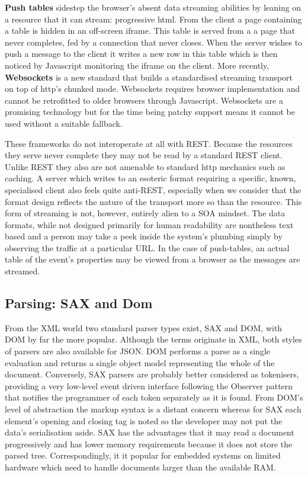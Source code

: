 \documentclass[]{article}
\begin{document}
\textbf{Push tables} sidestep the browser's absent data streaming
abilities by leaning on a resource that it can stream: progressive html.
From the client a page containing a table is hidden in an off-screen
iframe. This table is served from a a page that never completes, fed by
a connection that never closes. When the server wishes to push a message
to the client it writes a new row in this table which is then noticed by
Javascript monitoring the iframe on the client. More recently,
\textbf{Websockets} is a new standard that builds a standardised
streaming transport on top of http's chunked mode. Websockets requires
browser implementation and cannot be retrofitted to older browsers
through Javascript. Websockets are a promising technology but for the
time being patchy support means it cannot be used without a suitable
fallback.

These frameworks do not interoperate at all with REST. Because the
resources they serve never complete they may not be read by a standard
REST client. Unlike REST they also are not amenable to standard http
mechanics such as caching. A server which writes to an esoteric format
requiring a specific, known, specialised client also feels quite
anti-REST, especially when we consider that the format design reflects
the nature of the transport more so than the resource. This form of
streaming is not, however, entirely alien to a SOA mindset. The data
formats, while not designed primarily for human readability are
nontheless text based and a person may take a peek inside the system's
plumbing simply by observing the traffic at a particular URL. In the
case of push-tables, an actual table of the event's properties may be
viewed from a browser as the messages are streamed.

\subsection{Parsing: SAX and Dom}

From the XML world two standard parser types exist, SAX and DOM, with
DOM by far the more popular. Although the terms originate in XML, both
styles of parsers are also available for JSON. DOM performs a parse as a
single evaluation and returns a single object model representing the
whole of the document. Conversely, SAX parsers are probably better
considered as tokenisers, providing a very low-level event driven
interface following the Observer pattern that notifies the programmer of
each token separately as it is found. From DOM's level of abstraction
the markup syntax is a distant concern whereas for SAX each element's
opening and closing tag is noted so the developer may not put the data's
serialisation aside. SAX has the advantages that it may read a document
progressively and has lower memory requirements because it does not
store the parsed tree. Correspondingly, it it popular for embedded
systems on limited hardware which need to handle documents larger than
the available RAM.
\end{document}
